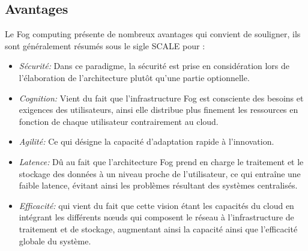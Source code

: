 \subsection{Avantages}
Le Fog computing présente de nombreux avantages qui convient de souligner, ils sont généralement résumés sous le sigle SCALE pour :
\begin{itemize}
  \item \emph{Sécurité:} Dans ce paradigme, la sécurité est prise en considération lors de l’élaboration de l’architecture plutôt qu’une partie optionnelle.
  \item \emph{Cognition:} Vient du fait que l’infrastructure Fog est consciente des besoins et exigences des utilisateurs, ainsi elle distribue plus finement les ressources en fonction de chaque utilisateur contrairement au cloud.
  \item \emph{Agilité:} Ce qui désigne la capacité d'adaptation rapide à l’innovation.
  \item \emph{Latence:} Dû au fait que l’architecture Fog prend en charge le traitement et le stockage des données à un niveau proche de l'utilisateur, ce qui entraîne une faible latence, évitant ainsi les problèmes résultant des systèmes centralisés.
  \item \emph{Efficacité:} qui vient du fait que cette vision étant les capacités du cloud en intégrant
  les différents nœuds qui composent le réseau à l’infrastructure de traitement et de stockage, augmentant ainsi la capacité ainsi que l’efficacité globale du système.
\end{itemize}
